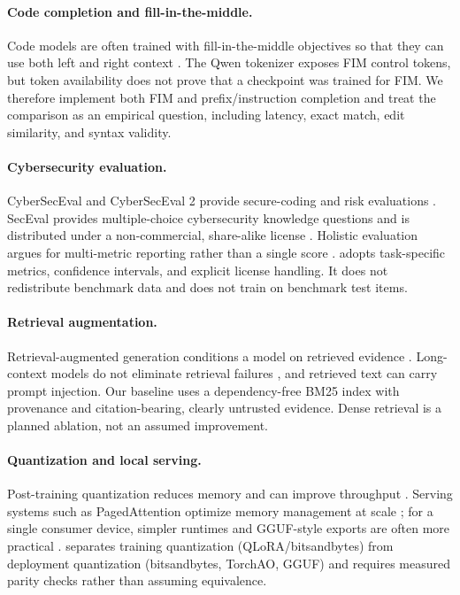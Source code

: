 \paragraph{Code completion and fill-in-the-middle.}
Code models are often trained with fill-in-the-middle objectives so that they can
use both left and right context \citep{bavarian2022fim,li2023starcoder}. The
Qwen tokenizer exposes FIM control tokens, but token availability does not prove
that a checkpoint was trained for FIM. We therefore implement both FIM and
prefix/instruction completion and treat the comparison as an empirical question,
including latency, exact match, edit similarity, and syntax validity.

\paragraph{Cybersecurity evaluation.}
CyberSecEval and CyberSecEval 2 provide secure-coding and risk evaluations
\citep{bhatt2023cyberseceval,bhatt2024cyberseceval2}. SecEval provides
multiple-choice cybersecurity knowledge questions and is distributed under a
non-commercial, share-alike license \citep{li2023seceval}. Holistic evaluation
argues for multi-metric reporting rather than a single score
\citep{liang2022helm}. \cyberlite{} adopts task-specific metrics, confidence
intervals, and explicit license handling. It does not redistribute benchmark
data and does not train on benchmark test items.

\paragraph{Retrieval augmentation.}
Retrieval-augmented generation conditions a model on retrieved evidence
\citep{lewis2020rag}. Long-context models do not eliminate retrieval failures
\citep{liu2023lost}, and retrieved text can carry prompt injection. Our baseline
uses a dependency-free BM25 index with provenance and citation-bearing, clearly
untrusted evidence. Dense retrieval is a planned ablation, not an assumed
improvement.

\paragraph{Quantization and local serving.}
Post-training quantization reduces memory and can improve throughput
\citep{frantar2022gptq,lin2023awq}. Serving systems such as PagedAttention
optimize memory management at scale \citep{kwon2023vllm}; for a single consumer
device, simpler runtimes and GGUF-style exports are often more practical
\citep{gerganov_llamacpp}. \cyberlite{} separates training quantization
(QLoRA/bitsandbytes) from deployment quantization (bitsandbytes, TorchAO,
GGUF) and requires measured parity checks rather than assuming equivalence.

